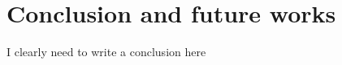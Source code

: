 \chapter{Conclusion and future works}
\label{chap:conclusion}
I clearly need to write a conclusion here
